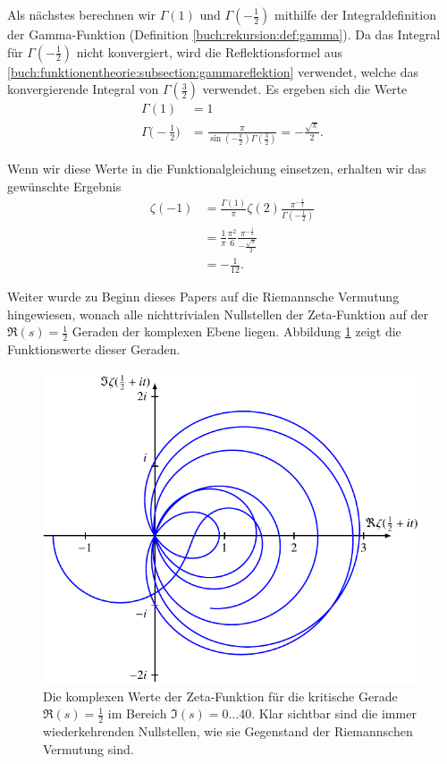 Als nächstes berechnen wir $\Gamma(1)$ und $\Gamma(-\frac{1}{2})$ mithilfe der Integraldefinition der Gamma-Funktion (Definition \ref{buch:rekursion:def:gamma}).
Da das Integral für $\Gamma(-\frac{1}{2})$ nicht konvergiert, wird die Reflektionsformel aus \ref{buch:funktionentheorie:subsection:gammareflektion} verwendet, welche das konvergierende Integral von  $\Gamma(\frac{3}{2})$ verwendet.
Es ergeben sich die Werte
\begin{align*}
    \Gamma(1)
    &= 1\\
    \Gamma\biggl(-\frac{1}{2}\biggr)
    &= \frac{\pi}{\sin(-\frac{\pi}{2})
    \Gamma(\frac{3}{2})}
    = -\frac{\sqrt{\pi}}{2}.
\end{align*}

Wenn wir diese Werte in die Funktionalgleichung einsetzen, erhalten wir das gewünschte Ergebnis
\begin{align*}
    \zeta(-1)
    &=
    \frac{\Gamma(1)}{\pi}
    \zeta(2)
    \frac{\pi^{-\frac{1}{2}}}{\Gamma ( -\frac{1}{2} )}
    \\
    &=
    \frac{1}{\pi}
    \frac{\pi^2}{6}
    \frac{\pi^{-\frac{1}{2}}}{
    -\frac{\sqrt{\pi}}{2}}
    \\
    &=
    -\frac{1}{12}.
\end{align*}

Weiter wurde zu Beginn dieses Papers auf die Riemannsche Vermutung hingewiesen, wonach alle nichttrivialen Nullstellen der Zeta-Funktion auf der $\Re(s)=\frac{1}{2}$ Geraden der komplexen Ebene liegen.
Abbildung \ref{zeta:fig:einzweitel} zeigt die Funktionswerte dieser Geraden.
\begin{figure}
    \centering
    \includegraphics{papers/zeta/images/zetaplot.pdf}
    \caption{Die komplexen Werte der Zeta-Funktion für die kritische Gerade $\Re(s)=\frac{1}{2}$ im Bereich $\Im(s) = 0\dots40$.
    Klar sichtbar sind die immer wiederkehrenden Nullstellen, wie sie Gegenstand der Riemannschen Vermutung sind.}
    \label{zeta:fig:einzweitel}
\end{figure}

